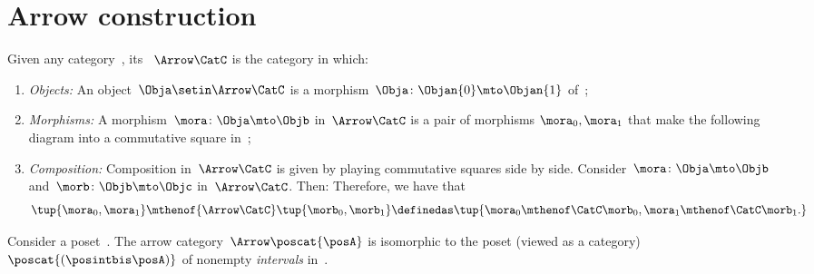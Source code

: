 
\section{Arrow construction}


\begin{ctdefinition}
    \label{def:arrow_category}
    Given any category~\CatC, its \emph{}~$\Arrow\CatC$ is the category in which:
    \begin{enumerate}
        \item \emph{Objects:} An object~$\Obja \setin \Arrow\CatC$ is a morphism~$\Obja\colon \Objan{0}\mto \Objan{1}$ of~\CatC;
        \item \emph{Morphisms:} A morphism~$\mora\colon \Obja \mto \Objb$ in~$\Arrow\CatC$ is a pair of morphisms $\mora_0,\mora_1$ that make the following diagram into a commutative square in~\CatC;
        \item \emph{Composition:} Composition in~$\Arrow \CatC$ is given by playing commutative squares side by side.
              Consider~$\mora\colon \Obja \mto \Objb$ and~$\morb\colon \Objb \mto \Objc$ in~$\Arrow\CatC$.
              Then:
            Therefore, we have that
            \begin{equation}\label{eq:arrow-cat-composition}
                \tup{\mora_0,\mora_1} \mthenof{\Arrow \CatC} \tup{\morb_0,\morb_1}
                \definedas \tup{\mora_0\mthenof\CatC\morb_0, \mora_1\mthenof\CatC\morb_1.}
            \end{equation}
    \end{enumerate}
\end{ctdefinition}

\begin{example}[Intervals]
    \label{exa:arrow-poset}
    Consider a poset~\posA.
    The arrow category~$\Arrow \poscat{\posA}$ is isomorphic to the poset (viewed as a category)~$\poscat{\left(\posintbis\posA\right)}$ of nonempty \emph{intervals} in~\posA.
\end{example}



